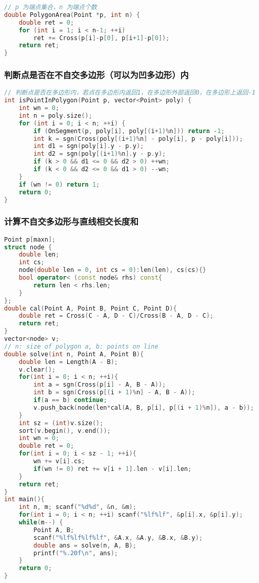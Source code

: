 \begin{lstlisting}[language=C++]
// p 为端点集合，n 为端点个数
double PolygonArea(Point *p, int n) {
    double ret = 0;
    for (int i = 1; i < n-1; ++i)
        ret += Cross(p[i]-p[0], p[i+1]-p[0]);
    return ret;
}
\end{lstlisting}

\subsubsection{判断点是否在不自交多边形（可以为凹多边形）内}

\begin{lstlisting}[language=C++]
// 判断点是否在多边形内，若点在多边形内返回1，在多边形外部返回0，在多边形上返回-1
int isPointInPolygon(Point p, vector<Point> poly) {
    int wn = 0;
    int n = poly.size();
    for (int i = 0; i < n; ++i) {
        if (OnSegment(p, poly[i], poly[(i+1)%n])) return -1;
        int k = sgn(Cross(poly[(i+1)%n] - poly[i], p - poly[i]));
        int d1 = sgn(poly[i].y - p.y);
        int d2 = sgn(poly[(i+1)%n].y - p.y);
        if (k > 0 && d1 <= 0 && d2 > 0) ++wn;
        if (k < 0 && d2 <= 0 && d1 > 0) --wn;
    }
    if (wn != 0) return 1;
    return 0;
}
\end{lstlisting}

\subsubsection{计算不自交多边形与直线相交长度和}

\begin{lstlisting}[language=C++]
Point p[maxn];
struct node {
    double len;
    int cs;
    node(double len = 0, int cs = 0):len(len), cs(cs){}
    bool operator< (const node& rhs) const{
        return len < rhs.len;
    }
};
double cal(Point A, Point B, Point C, Point D){
    double ret = Cross(C - A, D - C)/Cross(B - A, D - C);
    return ret;
}
vector<node> v;
// n: size of polygon a, b: points on line
double solve(int n, Point A, Point B){
    double len = Length(A - B);
    v.clear();
    for(int i = 0; i < n; ++i){
        int a = sgn(Cross(p[i] - A, B - A));
        int b = sgn(Cross(p[(i + 1)%n] - A, B - A));
        if(a == b) continue;
        v.push_back(node(len*cal(A, B, p[i], p[(i + 1)%n]), a - b));
    }
    int sz = (int)v.size();
    sort(v.begin(), v.end());
    int wn = 0;
    double ret = 0;
    for(int i = 0; i < sz - 1; ++i){
        wn += v[i].cs;
        if(wn != 0) ret += v[i + 1].len - v[i].len;
    }
    return ret;
}
int main(){
    int n, m; scanf("%d%d", &n, &m);
    for(int i = 0; i < n; ++i) scanf("%lf%lf", &p[i].x, &p[i].y);
    while(m--) {
        Point A, B;
        scanf("%lf%lf%lf%lf", &A.x, &A.y, &B.x, &B.y);
        double ans = solve(n, A, B);
        printf("%.20f\n", ans);
    }
    return 0;
}
\end{lstlisting}

